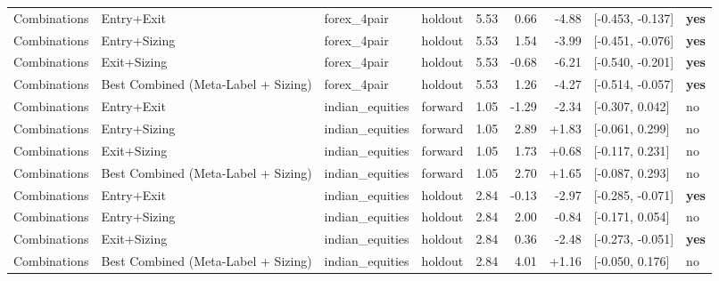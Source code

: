 \begin{longtable}{l l l l r r r l l}
Combinations & Entry+Exit & forex\_4pair & holdout & 5.53 & 0.66 & -4.88 & [-0.453, -0.137] & \textbf{yes} \\
Combinations & Entry+Sizing & forex\_4pair & holdout & 5.53 & 1.54 & -3.99 & [-0.451, -0.076] & \textbf{yes} \\
Combinations & Exit+Sizing & forex\_4pair & holdout & 5.53 & -0.68 & -6.21 & [-0.540, -0.201] & \textbf{yes} \\
Combinations & Best Combined (Meta-Label + Sizing) & forex\_4pair & holdout & 5.53 & 1.26 & -4.27 & [-0.514, -0.057] & \textbf{yes} \\
Combinations & Entry+Exit & indian\_equities & forward & 1.05 & -1.29 & -2.34 & [-0.307, 0.042] & no \\
Combinations & Entry+Sizing & indian\_equities & forward & 1.05 & 2.89 & +1.83 & [-0.061, 0.299] & no \\
Combinations & Exit+Sizing & indian\_equities & forward & 1.05 & 1.73 & +0.68 & [-0.117, 0.231] & no \\
Combinations & Best Combined (Meta-Label + Sizing) & indian\_equities & forward & 1.05 & 2.70 & +1.65 & [-0.087, 0.293] & no \\
Combinations & Entry+Exit & indian\_equities & holdout & 2.84 & -0.13 & -2.97 & [-0.285, -0.071] & \textbf{yes} \\
Combinations & Entry+Sizing & indian\_equities & holdout & 2.84 & 2.00 & -0.84 & [-0.171, 0.054] & no \\
Combinations & Exit+Sizing & indian\_equities & holdout & 2.84 & 0.36 & -2.48 & [-0.273, -0.051] & \textbf{yes} \\
Combinations & Best Combined (Meta-Label + Sizing) & indian\_equities & holdout & 2.84 & 4.01 & +1.16 & [-0.050, 0.176] & no \\
\end{longtable}
